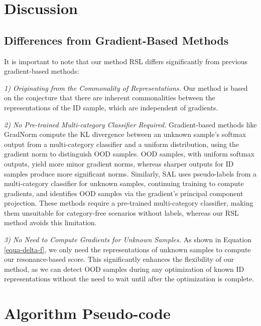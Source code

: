 \section{Discussion}
\subsection{Differences from Gradient-Based Methods}
It is important to note that our method RSL differs significantly from previous gradient-based methods:

\textit{1) Originating from the Commonality of Representations.} Our method is based on the conjecture that there are inherent commonalities between the representations of the ID sample, which are independent of gradients.

 \textit{2) No Pre-trained Multi-category Classifier Required.}  
Gradient-based methods like GradNorm \citep{huang2021importance} compute the KL divergence between an unknown sample's softmax output from a multi-category classifier and a uniform distribution, using the gradient norm to distinguish OOD samples. OOD samples, with uniform softmax outputs, yield more minor gradient norms, whereas sharper outputs for ID samples produce more significant norms. Similarly, SAL \citep{du2024does} uses pseudo-labels from a multi-category classifier for unknown samples, continuing training to compute gradients, and identifies OOD samples via the gradient's principal component projection. These methods require a pre-trained multi-category classifier, making them unsuitable for category-free scenarios without labels, whereas our RSL method avoids this limitation.


 \textit{ 3) No Need to Compute Gradients for Unknown Samples.} As shown in Equation \ref{equa-delta-f}, we only need the representations of unknown samples to compute our resonance-based score. This significantly enhances the flexibility of our method, as we can detect OOD samples during any optimization of known ID representations without the need to wait until after the optimization is complete.

\section{Algorithm Pseudo-code}\label{Algorithm}

